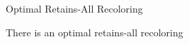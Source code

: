 \begin{frame}{Optimal Retains-All Recoloring}
\begin{lemma}
There is an optimal retains-all recoloring
\end{lemma}

\end{frame}